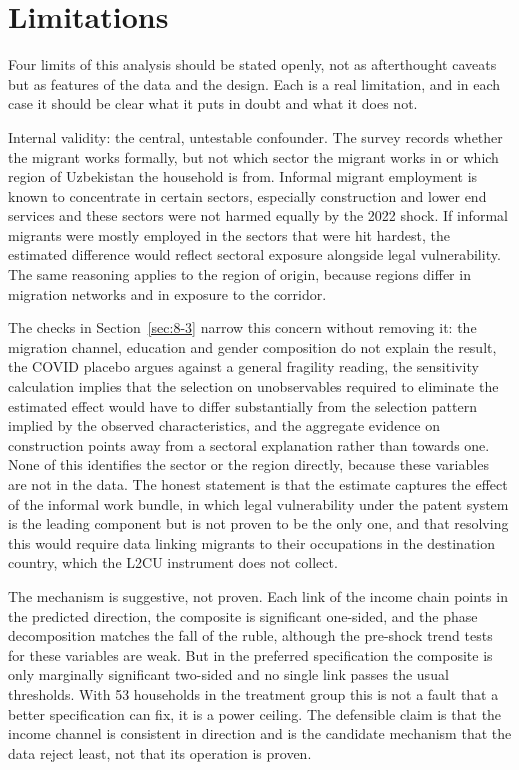 \section{Limitations}\label{sec:9}

Four limits of this analysis should be stated openly, not as afterthought caveats but as features of the data and the design. Each is a real limitation, and in each case it should be clear what it puts in doubt and what it does not.

Internal validity: the central, untestable confounder. The survey records whether the migrant works formally, but not which sector the migrant works in or which region of Uzbekistan the household is from. Informal migrant employment is known to concentrate in certain sectors, especially construction and lower end services and these sectors were not harmed equally by the 2022 shock. If informal migrants were mostly employed in the sectors that were hit hardest, the estimated difference would reflect sectoral exposure alongside legal vulnerability. The same reasoning applies to the region of origin, because regions differ in migration networks and in exposure to the corridor.

The checks in Section~\ref{sec:8-3} narrow this concern without removing it: the migration channel, education and gender composition do not explain the result, the COVID placebo argues against a general fragility reading, the sensitivity calculation implies that the selection on unobservables required to eliminate the estimated effect would have to differ substantially from the selection pattern implied by the observed characteristics, and the aggregate evidence on construction points away from a sectoral explanation rather than towards one. None of this identifies the sector or the region directly, because these variables are not in the data. The honest statement is that the estimate captures the effect of the informal work bundle, in which legal vulnerability under the patent system is the leading component but is not proven to be the only one, and that resolving this would require data linking migrants to their occupations in the destination country, which the L2CU instrument does not collect.

The mechanism is suggestive, not proven. Each link of the income chain points in the predicted direction, the composite is significant one-sided, and the phase decomposition matches the fall of the ruble, although the pre-shock trend tests for these variables are weak. But in the preferred specification the composite is only marginally significant two-sided and no single link passes the usual thresholds. With 53 households in the treatment group this is not a fault that a better specification can fix, it is a power ceiling. The defensible claim is that the income channel is consistent in direction and is the candidate mechanism that the data reject least, not that its operation is proven.

